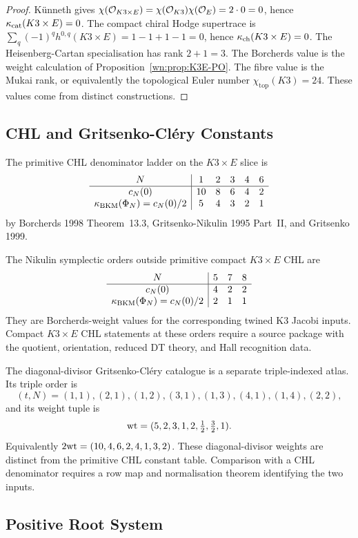 \begin{proof}
K\"unneth gives
$\chi(\mathcal{O}_{K3\times E})=\chi(\mathcal{O}_{K3})\chi(\mathcal{O}_E)=2\cdot0=0$, hence
$\kappa_{\mathrm{cat}}(K3\times E)=0$. The compact chiral Hodge supertrace is
$\sum_q(-1)^q h^{0,q}(K3\times E)=1-1+1-1=0$, hence
$\kappa_{\mathrm{ch}}(K3\times E)=0$. The Heisenberg-Cartan specialisation has rank
$2+1=3$. The Borcherds value is the weight calculation of
Proposition~\ref{wn:prop:K3E-PO}. The fibre value is the Mukai rank, or
equivalently the topological Euler number
$\chi_{\mathrm{top}}(K3)=24$. These values come from distinct
constructions.
\end{proof}

\subsection{CHL and Gritsenko-Cl\'ery Constants}
\label{wn:subsec:constants}

The primitive CHL denominator ladder on the $K3\times E$ slice is
\[
\begin{array}{c|ccccc}
N&1&2&3&4&6\\ \hline
c_N(0)&10&8&6&4&2\\
\kappa_{\mathrm{BKM}}(\Phi_N)=c_N(0)/2&5&4&3&2&1
\end{array}
\]
by Borcherds 1998 Theorem~13.3, Gritsenko-Nikulin 1995 Part~II, and
Gritsenko 1999.

The Nikulin symplectic orders outside primitive compact $K3\times E$
CHL are
\[
\begin{array}{c|ccc}
N&5&7&8\\ \hline
c_N(0)&4&2&2\\
\kappa_{\mathrm{BKM}}(\Phi_N)=c_N(0)/2&2&1&1
\end{array}
\]
They are Borcherds-weight values for the corresponding twined K3
Jacobi inputs. Compact $K3\times E$ CHL statements at these orders
require a source package with the quotient, orientation, reduced DT
theory, and Hall recognition data.

The diagonal-divisor Gritsenko-Cl\'ery catalogue is a separate
triple-indexed atlas. Its triple order is
\[
(t,N)=(1,1),(2,1),(1,2),(3,1),(1,3),(4,1),(1,4),(2,2),
\]
and its weight tuple is
\[
 \mathrm{wt}=(5,2,3,1,2,\tfrac12,\tfrac32,1).
\]
Equivalently $2\mathrm{wt}=(10,4,6,2,4,1,3,2)$. These diagonal-divisor
weights are distinct from the primitive CHL constant table. Comparison
with a CHL denominator requires a row map and normalisation theorem
identifying the two inputs.

\subsection{Positive Root System}
\label{wn:subsec:positive-root-system}

